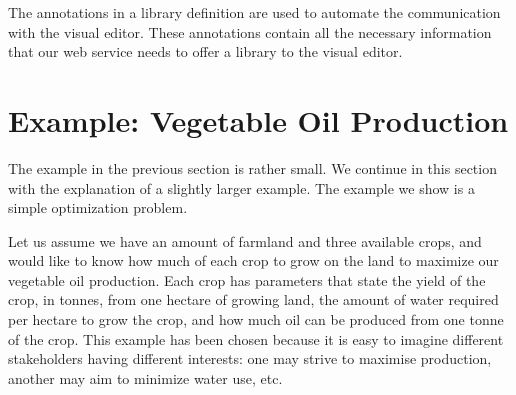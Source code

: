 \documentclass[a4paper]{article}
\begin{document}
The annotations in a library definition are used to automate the communication
with the visual editor. These annotations contain all the necessary information
that our web service needs to offer a library to the visual editor. 


\section{Example: Vegetable Oil Production}

The example in the previous section is rather small. We continue in this section
with the explanation of a slightly larger example. The example we show is a
simple optimization problem.

Let us assume we have an amount of farmland and three available crops, and would
like to know how much of each crop to grow on the land to maximize our vegetable
oil production. Each crop has parameters that state the yield of the crop, in
tonnes, from one hectare of growing land, the amount of water required per
hectare to grow the crop, and how much oil can be produced from one tonne of the
crop.
%
This example has been chosen because it is easy to imagine different
stakeholders having different interests: one may strive to maximise
production, another may aim to minimize water use, etc.
\end{document}
